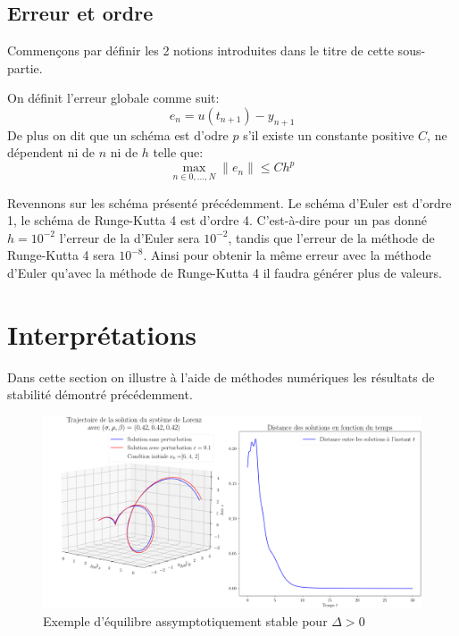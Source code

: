 \documentclass{article}
\newtheorem[M , nocut]{prop}{Proposition}[section]
\newtheorem[M , nocut]{definition}{Définition}
\newtheorem[M , nocut]{lemme}{Lemme}
\newtheorem[L , nocut]{thm}{Théoreme}
\newtheorem[M , nocut]{cor}{Corollaire}
\begin{document}
\subsection*{Erreur et ordre}

Commençons par définir les 2 notions introduites dans le titre de cette sous-partie.
\begin{definition}
    On définit l'erreur globale comme suit:
    $$ e_n = u(t_{n+1}) - y_{n+1} $$
    De plus on dit que un schéma est d'odre $p$ s'il existe un constante positive $C$, ne dépendent ni de $n$ ni de $h$ telle que:
    $$ \max_{n\in 0,\dots,N} \|e_n\| \le C h^p$$
\end{definition}
Revennons sur les schéma présenté précédemment. Le schéma d'Euler est d'ordre 1, le schéma de Runge-Kutta 4 est d'ordre 4. C'est-\`a-dire pour un pas donné $h=10^{-2}$ l'erreur de la d'Euler sera $10^{-2}$, tandis que l'erreur de la méthode de Runge-Kutta 4 sera $10^{-8}$. Ainsi pour obtenir la même erreur avec la méthode d'Euler qu'avec la méthode de Runge-Kutta 4 il faudra générer plus de valeurs.

\newpage
\section{Interprétations}
Dans cette section on illustre à l'aide de méthodes numériques les résultats de stabilité démontré précédemment.

\begin{figure}[!ht]
    \label{fig:EqAS-Dsup0}
    \centering
    \includegraphics[width = \textwidth]{EqAS-Dsup0}
    \caption{Exemple d'équilibre assymptotiquement stable pour $\Delta>0$}
\end{figure}
\end{document}
